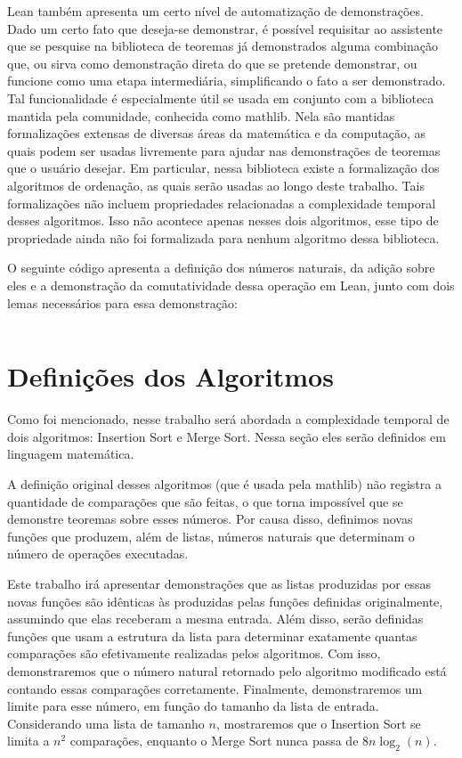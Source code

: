 \documentclass[12pt, oneside, a4paper,english,brazil]{abntex2}
\begin{document}
\qquad Lean tamb\'em apresenta um certo n\'ivel de automatiza\c{c}\~ao de demonstra\c{c}\~oes. Dado um certo fato que deseja-se demonstrar, \'e poss\'ivel requisitar ao assistente que se pesquise na biblioteca de teoremas j\'a demonstrados alguma combina\c{c}\~ao que, ou sirva como demonstra\c{c}\~ao direta do que se pretende demonstrar, ou funcione como uma etapa intermedi\'aria, simplificando o fato a ser demonstrado. Tal funcionalidade \'e especialmente \'util se usada em conjunto com a biblioteca mantida pela comunidade, conhecida como mathlib\cite{3}. Nela s\~ao mantidas formaliza\c{c}\~oes extensas de diversas \'areas da matem\'atica e da computa\c{c}\~ao, as quais podem ser usadas livremente para ajudar nas demonstra\c{c}\~oes de teoremas que o usu\'ario desejar. Em particular, nessa biblioteca existe a formaliza\c{c}\~ao dos algoritmos de ordena\c{c}\~ao, as quais ser\~ao usadas ao longo deste trabalho. Tais formaliza\c{c}\~oes
n\~ao incluem propriedades relacionadas a complexidade temporal desses algoritmos. Isso n\~ao acontece
apenas nesses dois algoritmos,
esse tipo de propriedade ainda n\~ao foi formalizada para nenhum algoritmo dessa biblioteca.

\qquad O seguinte c\'odigo apresenta a defini\c{c}\~ao dos n\'umeros naturais, da adi\c{c}\~ao sobre eles e a demonstra\c{c}\~ao da comutatividade dessa opera\c{c}\~ao em Lean, junto com dois lemas necess\'arios para essa demonstra\c{c}\~ao:
\newpage

\inputminted{lean}{add.lean}

\chapter{Defini\c{c}\~oes dos Algoritmos}

\qquad Como foi mencionado, nesse trabalho ser\'a abordada a complexidade
temporal de dois algoritmos: Insertion Sort e Merge Sort. Nessa se\c{c}\~ao
eles ser\~ao definidos em linguagem matem\'atica.

\qquad A defini\c{c}\~ao original desses algoritmos (que \'e usada pela mathlib)
n\~ao registra a quantidade de compara\c{c}\~oes que
s\~ao feitas, o que torna imposs\'ivel que se demonstre
teoremas sobre esses n\'umeros. Por causa
disso, definimos novas fun\c{c}\~oes que produzem, al\'em de listas,
n\'umeros naturais que determinam o n\'umero de opera\c{c}\~oes executadas.

\qquad Este trabalho ir\'a apresentar demonstra\c{c}\~oes que as listas
produzidas por essas novas fun\c{c}\~oes s\~ao id\^enticas \`as produzidas pelas
fun\c{c}\~oes definidas originalmente, assumindo que elas receberam a mesma entrada. Al\'em
disso, ser\~ao definidas fun\c{c}\~oes que usam a estrutura da lista para
determinar exatamente quantas compara\c{c}\~oes s\~ao efetivamente realizadas
pelos algoritmos. Com isso, demonstraremos que o n\'umero natural retornado pelo
algoritmo modificado est\'a contando essas compara\c{c}\~oes corretamente. Finalmente,
demonstraremos um limite para esse n\'umero, em fun\c{c}\~ao do tamanho da lista de entrada.
Considerando uma lista de tamanho $n$, mostraremos que o Insertion Sort se limita a $n^{2}$
compara\c{c}\~oes, enquanto o Merge Sort nunca passa de $8 n \log_{2} (n)$.
\end{document}
